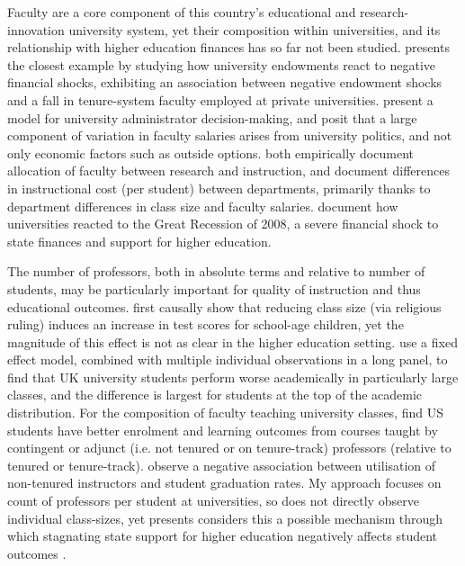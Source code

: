 \documentclass[notitlepage,12pt]{article}
\begin{document}
Faculty are a core component of this country's educational and research-innovation university system, yet their composition within universities, and its relationship with higher education finances has so far not been studied.
\cite{brown2014endowment} presents the closest example by studying how university endowments react to negative financial shocks, exhibiting an association between negative endowment shocks and a fall in tenure-system faculty employed at private universities.
\cite{abe2015implications} present a model for university administrator decision-making, and posit that a large component of variation in faculty salaries arises from university politics, and not only economic factors such as outside options.
\cite{johnson2009jep,NBERc13879} both empirically document allocation of faculty between research and instruction, and \cite{hemelt2021math} document differences in instructional cost (per student) between departments, primarily thanks to department differences in class size and faculty salaries.
\cite{turner2014impact} document how universities reacted to the Great Recession of 2008, a severe financial shock to state finances and support for higher education.

The number of professors, both in absolute terms and relative to number of students, may be particularly important for quality of instruction and thus educational outcomes.
\cite{angrist1999using} first causally show that reducing class size (via religious ruling) induces an increase in test scores for school-age children, yet the magnitude of this effect is not as clear in the higher education setting.
\cite{bandiera2010heterogeneous} use a fixed effect model, combined with multiple individual observations in a long panel, to find that UK university students perform worse academically in particularly large classes, and the difference is largest for students at the top of the academic distribution.
For the composition of faculty teaching university classes, \cite{bettinger2010does,figlio2015tenure} find US students have better enrolment and learning outcomes from courses taught by contingent or adjunct (i.e. not tenured or on tenure-track) professors (relative to tenured or tenure-track).
\cite{ehrenberg2005tenured} observe a negative association between utilisation of non-tenured instructors and student graduation rates.
My approach focuses on count of professors per student at universities, so does not directly observe individual class-sizes, yet presents considers this a possible mechanism through which stagnating state support for higher education negatively affects student outcomes \citep{NBERw23736,NBERw27885}.
\end{document}

